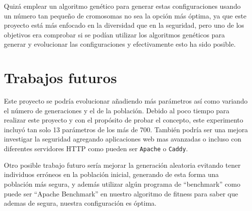 \bigskip
Quizá emplear un algoritmo genético para generar estas configuraciones usando un número tan pequeño de cromosomas no sea la opción más óptima, ya que este proyecto está más enfocado en la diversidad que en la seguridad, pero uno de los objetivos era comprobar si se podían utilizar los algoritmos genéticos para generar y evolucionar las configuraciones y efectivamente esto ha sido posible.

\section{Trabajos futuros}
Este proyecto se podría evolucionar añadiendo más parámetros así como variando el número de generaciones y el de la población. Debido al poco tiempo para realizar este proyecto y con el propósito de probar el concepto, este experimento incluyó tan solo 13 parámetros de los más de 700. También podría ser una mejora investigar la seguridad agregando aplicaciones web mas avanzadas o incluso con diferentes servidores HTTP como pueden ser  \texttt{Apache} o \texttt{Caddy}.

\bigskip
Otro posible trabajo futuro sería mejorar la generación aleatoria evitando tener individuos erróneos en la población inicial, generando de esta forma una población más segura, y además utilizar algún programa de ``benchmark'' como puede ser ``Apache Benchmark'' en nuestro algoritmo de fitness para saber que ademas de segura, nuestra configuración es óptima.
